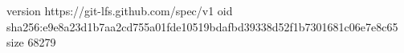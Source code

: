 version https://git-lfs.github.com/spec/v1
oid sha256:e9e8a23d1b7aa2cd755a01fde10519bdafbd39338d52f1b7301681c06e7e8c65
size 68279

